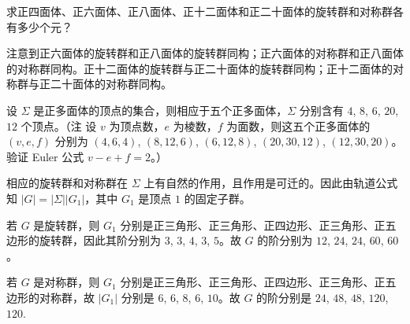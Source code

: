 \documentclass[../../main.tex]{subfiles}%
\begin{document}
\begin{example}
求正四面体、正六面体、正八面体、正十二面体和正二十面体的旋转群和对称群各有多少个元？
\end{example}
\begin{remark}
注意到正六面体的旋转群和正八面体的旋转群同构；正六面体的对称群和正八面体的对称群同构。正十二面体的旋转群与正二十面体的旋转群同构；正十二面体的对称群与正二十面体的对称群同构。
\end{remark}
\begin{solution}

设 $\Sigma$ 是正多面体的顶点的集合，则相应于五个正多面体，$\Sigma$ 分别含有 $4$, $8$, $6$, $20$, $12$ 个顶点。（注 设 $v$ 为顶点数，$e$ 为棱数，$f$ 为面数，则这五个正多面体的 $(v,e,f)$ 分别为 $(4,6,4)$, $(8,12,6)$, $(6,12,8)$, $(20,30,12)$, $(12,30,20)$。验证 Euler 公式 $v - e + f = 2$。）

相应的旋转群和对称群在 $\Sigma$ 上有自然的作用，且作用是可迁的。因此由轨道公式知 $|G| = |\Sigma||G_1|$，其中 $G_1$ 是顶点 $1$ 的固定子群。

若 $G$ 是旋转群，则 $G_1$ 分别是正三角形、正三角形、正四边形、正三角形、正五边形的旋转群，因此其阶分别为 $3$, $3$, $4$, $3$, $5$。故 $G$ 的阶分别为 $12$, $24$, $24$, $60$, $60$。

若 $G$ 是对称群，则 $G_1$ 分别是正三角形、正三角形、正四边形、正三角形、正五边形的对称群，故 $|G_1|$ 分别是 $6$, $6$, $8$, $6$, $10$。故 $G$ 的阶分别是 $24$, $48$, $48$, $120$, $120$.

\end{solution}
\end{document}

